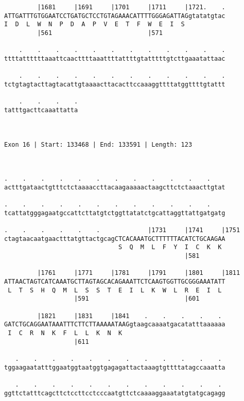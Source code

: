 \documentclass{article}
\begin{document}
\begin{Verbatim}
         |1681     |1691     |1701     |1711     |1721.    .
ATTGATTTGTGGAATCCTGATGCTCCTGTAGAAACATTTTGGGAGATTAGgtatatgtac
I  D  L  W  N  P  D  A  P  V  E  T  F  W  E  I  S           
         |561                          |571                 
  
    .    .    .    .    .    .    .    .    .    .    .    .
ttttattttttaaattcaacttttaaattttattttgtatttttgtcttgaaatattaac
                                                            
    .    .    .    .    .    .    .    .    .    .    .    .
tctgtagtacttagtacattgtaaaacttacacttccaaaggttttatggttttgtattt
                                                            
    .    .    .    .
tatttgacttcaaattatta
                    
                    
 
Exon 16 | Start: 133468 | End: 133591 | Length: 123



.    .    .    .    .    .    .    .    .    .    .    .    
actttgataactgtttctctaaaaccttacaagaaaaactaagcttctctaaacttgtat
                                                            
.    .    .    .    .    .    .    .    .    .    .    .    
tcattatgggagaatgccattcttatgtctggttatatctgcattaggttattgatgatg
                                                            
.    .    .    .    .    .             |1731     |1741     |1751
ctagtaacaatgaactttatgttactgcagCTCACAAATGCTTTTTTACATCTGCAAGAA
                               S  Q  M  L  F  Y  I  C  K  K 
                                                 |581       
  
         |1761     |1771     |1781     |1791     |1801     |1811
ATTAACTAGTCATCAAATGCTTAGTAGCACAGAAATTCTCAAGTGGTTGCGGGAAATATT
 L  T  S  H  Q  M  L  S  S  T  E  I  L  K  W  L  R  E  I  L 
                   |591                          |601       
  
         |1821     |1831     |1841    .    .    .    .    . 
GATCTGCAGGAATAAATTTCTTCTTAAAAATAAGgtaagcaaaatgacatatttaaaaaa
 I  C  R  N  K  F  L  L  K  N  K                            
                   |611                                     
  
   .    .    .    .    .    .    .    .    .    .    .    . 
tggaagaatatttggaatggtaatggtgagagattactaaagtgttttatagccaaatta
                                                            
   .    .    .    .    .    .    .    .    .    .    .    . 
ggttctatttcagcttctccttcctcccaatgttctcaaaaggaaatatgtatgcagagg
                                                            

\end{Verbatim}
\end{document}
